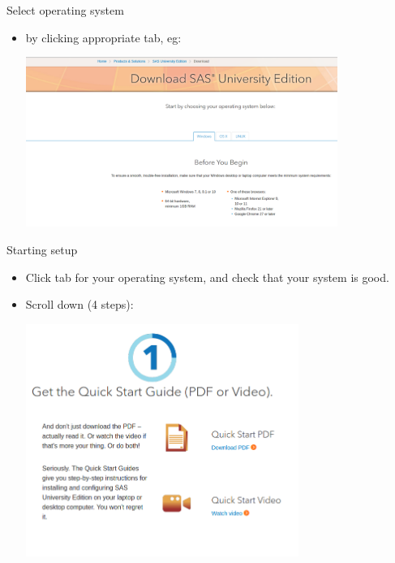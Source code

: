 \documentclass[unknownkeysallowed]{beamer}\usepackage[]{graphicx}\usepackage[]{color}
\begin{document}
\begin{frame}[fragile]{Select operating system}
  
  \begin{itemize}
  \item by clicking appropriate tab, eg:
    
    \includegraphics[width=4in]{sas17}
  \end{itemize}
  
\end{frame}

\begin{frame}[fragile]{Starting setup}
  
  \begin{itemize}
  \item Click tab for your operating system, and check that your
    system is good.
  \item Scroll down (4 steps):
    
    \includegraphics[width=3.5in]{sas18}
    
  \end{itemize}
  
\end{frame}
\end{document}
